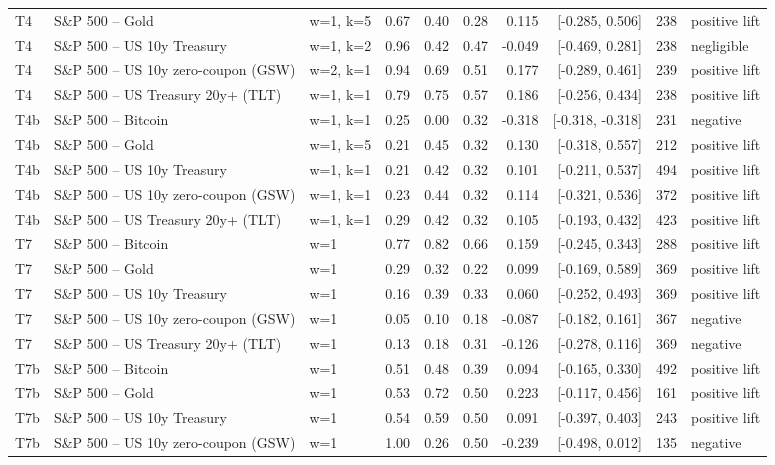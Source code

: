 \begin{figure}
\begin{tabular}{lllrrrrrrl}
T4 & S\&P 500 -- Gold & w=1, k=5 & 0.67 & 0.40 & 0.28 & 0.115 & [-0.285, 0.506] & 238 & positive lift \\
T4 & S\&P 500 -- US 10y Treasury & w=1, k=2 & 0.96 & 0.42 & 0.47 & -0.049 & [-0.469, 0.281] & 238 & negligible \\
T4 & S\&P 500 -- US 10y zero-coupon (GSW) & w=2, k=1 & 0.94 & 0.69 & 0.51 & 0.177 & [-0.289, 0.461] & 239 & positive lift \\
T4 & S\&P 500 -- US Treasury 20y+ (TLT) & w=1, k=1 & 0.79 & 0.75 & 0.57 & 0.186 & [-0.256, 0.434] & 238 & positive lift \\
T4b & S\&P 500 -- Bitcoin & w=1, k=1 & 0.25 & 0.00 & 0.32 & -0.318 & [-0.318, -0.318] & 231 & negative \\
T4b & S\&P 500 -- Gold & w=1, k=5 & 0.21 & 0.45 & 0.32 & 0.130 & [-0.318, 0.557] & 212 & positive lift \\
T4b & S\&P 500 -- US 10y Treasury & w=1, k=1 & 0.21 & 0.42 & 0.32 & 0.101 & [-0.211, 0.537] & 494 & positive lift \\
T4b & S\&P 500 -- US 10y zero-coupon (GSW) & w=1, k=1 & 0.23 & 0.44 & 0.32 & 0.114 & [-0.321, 0.536] & 372 & positive lift \\
T4b & S\&P 500 -- US Treasury 20y+ (TLT) & w=1, k=1 & 0.29 & 0.42 & 0.32 & 0.105 & [-0.193, 0.432] & 423 & positive lift \\
T7 & S\&P 500 -- Bitcoin & w=1 & 0.77 & 0.82 & 0.66 & 0.159 & [-0.245, 0.343] & 288 & positive lift \\
T7 & S\&P 500 -- Gold & w=1 & 0.29 & 0.32 & 0.22 & 0.099 & [-0.169, 0.589] & 369 & positive lift \\
T7 & S\&P 500 -- US 10y Treasury & w=1 & 0.16 & 0.39 & 0.33 & 0.060 & [-0.252, 0.493] & 369 & positive lift \\
T7 & S\&P 500 -- US 10y zero-coupon (GSW) & w=1 & 0.05 & 0.10 & 0.18 & -0.087 & [-0.182, 0.161] & 367 & negative \\
T7 & S\&P 500 -- US Treasury 20y+ (TLT) & w=1 & 0.13 & 0.18 & 0.31 & -0.126 & [-0.278, 0.116] & 369 & negative \\
T7b & S\&P 500 -- Bitcoin & w=1 & 0.51 & 0.48 & 0.39 & 0.094 & [-0.165, 0.330] & 492 & positive lift \\
T7b & S\&P 500 -- Gold & w=1 & 0.53 & 0.72 & 0.50 & 0.223 & [-0.117, 0.456] & 161 & positive lift \\
T7b & S\&P 500 -- US 10y Treasury & w=1 & 0.54 & 0.59 & 0.50 & 0.091 & [-0.397, 0.403] & 243 & positive lift \\
T7b & S\&P 500 -- US 10y zero-coupon (GSW) & w=1 & 1.00 & 0.26 & 0.50 & -0.239 & [-0.498, 0.012] & 135 & negative \\

\end{tabular}
\end{figure}
